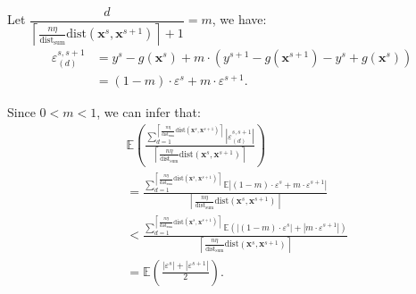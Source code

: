 \documentclass[lettersize,journal]{IEEEtran}
\begin{document}
{Let $\dfrac{d}{\left\lceil \frac{n\eta}{\text{dist}_
{\text{sum}}}\text{dist}(\boldsymbol{x}^s,\boldsymbol{x}^
{s+1})\right\rceil+1}=m$, we have:
\begin{equation*}
\begin{aligned}
\varepsilon^{s,s+1}_{(d)}
&=y^s-g(\boldsymbol{x}^s)+m\cdot(y^{s+1}-g(\boldsymbol
{x}^{s+1})-y^s+g(\boldsymbol{x}^{s}))\\
&=(1-m)\cdot\varepsilon^s+m\cdot\varepsilon^{s+1}.
\end{aligned}
\end{equation*}

Since $0<m<1$, we can infer that:
\begin{equation*}
\begin{aligned}
&\mathbb{E}(\frac{\textstyle\sum_{d=1}^{{\left\lceil 
\frac{n\eta }{\text{dist}_{\text{sum}}}\text{dist}
(\boldsymbol{x}^s,\boldsymbol{x}^{s+1})\right\rceil}}
{|\varepsilon^{s,s+1}_{(d)}|}}{\left\lceil \frac{n\eta }
{\text{dist}_{\text{sum}}}\text{dist}(\boldsymbol{x}^s,
\boldsymbol{x}^{s+1})\right\rceil}) \\
&=\frac{\textstyle\sum_{d=1}^{{\left\lceil \frac{n\eta }
{\text{dist}_{\text{sum}}}\text{dist}(\boldsymbol{x}^s,
\boldsymbol{x}^{s+1})\right\rceil}}{\mathbb{E}|(1-m)
\cdot\varepsilon^s+m\cdot\varepsilon^{s+1}|}}{\left\lceil 
\frac{n\eta }{\text{dist}_{\text{sum}}}\text{dist}
(\boldsymbol{x}^s,\boldsymbol{x}^{s+1})\right\rceil}\\
&<\frac{\textstyle\sum_{d=1}^{{\left\lceil \frac{n\eta }
{\text{dist}_{\text{sum}}}\text{dist}(\boldsymbol{x}^s,
\boldsymbol{x}^{s+1})\right\rceil}}{\mathbb{E}(|(1-m)
\cdot\varepsilon^s|+|m\cdot\varepsilon^{s+1}|)}}
{\left\lceil \frac{n\eta }{\text{dist}_{\text{sum}}}
\text{dist}(\boldsymbol{x}^s,\boldsymbol{x}^{s+1})\right
\rceil}\\
&=\mathbb{E}(\frac{|\varepsilon^s|+|\varepsilon^{s+1}|}
{2}).
\end{aligned}
\end{equation*}

}








\vfill
\end{document}
